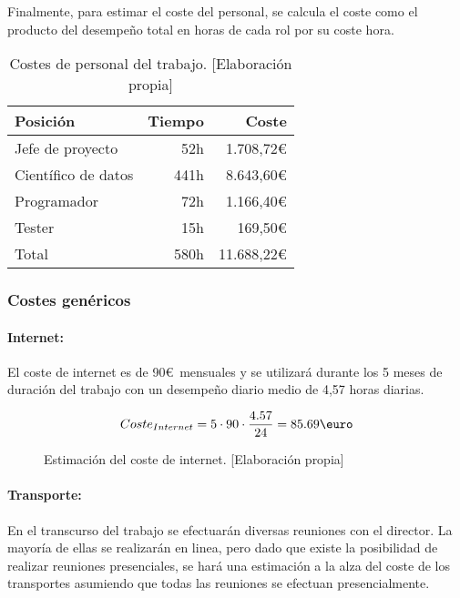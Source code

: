Finalmente, para estimar el coste del personal, se calcula el coste como el producto del desempeño
total en horas de cada rol por su coste hora.

\begin{table}[ht]
    \begin{center}
        \begin{tabular}{ l r r }
         Posición & Tiempo & Coste \\
         \hline
         Jefe de proyecto & 52h & 1.708,72\euro \\
         Científico de datos & 441h & 8.643,60\euro \\
         Programador & 72h & 1.166,40\euro \\
         Tester & 15h & 169,50\euro \\
         \hline
         Total & 580h & 11.688,22\euro
        \end{tabular}
        \caption{Costes de personal del trabajo. [Elaboración propia]}\label{rolcosttable}
    \end{center}
\end{table}


\subsubsection{Costes genéricos}\label{costesgenericos}
\paragraph{Internet:} El coste de internet es de 90\euro\ mensuales y se utilizará durante los 5 meses de
duración del trabajo con un desempeño diario medio de 4,57 horas diarias.
\begin{figure}[ht]
    \begin{align*}
        Coste_{Internet} = 5 \cdot 90 \cdot \frac{4.57}{24} = 85.69\text{\euro}
    \end{align*}
    \caption{Estimación del coste de internet.  [Elaboración propia]}
\end{figure}

\paragraph{Transporte:} En el transcurso del trabajo se efectuarán diversas reuniones con el director. La mayoría de ellas
se realizarán en linea, pero dado que existe la posibilidad de realizar reuniones presenciales, se hará una estimación
a la alza del coste de los transportes asumiendo que todas las reuniones se efectuan presencialmente.


